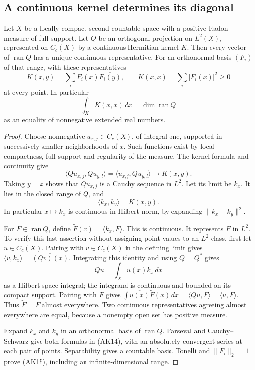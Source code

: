\subsection{A continuous kernel determines its diagonal}

\begin{lemma}\label{ak-diagonal}
Let \(X\) be a locally compact second countable space
with a positive Radon measure of full support.
Let \(Q\) be an orthogonal projection on \(L^2(X)\),
represented on \(C_c(X)\) by a continuous Hermitian
kernel \(K\).  Then every vector of \(\operatorname{ran}Q\)
has a unique continuous representative.  For an orthonormal
basis \((F_i)\) of that range, with these representatives,
\[
 K(x,y)=\sum_iF_i(x)\overline{F_i(y)},\qquad
 K(x,x)=\sum_i|F_i(x)|^2\ge0
 \tag{AK14}
\]
at every point.  In particular
\[
                \int_X K(x,x)\,dx
                    =\dim\operatorname{ran}Q
 \tag{AK15}
\]
as an equality of nonnegative extended real numbers.
\end{lemma}
\begin{proof}
Choose nonnegative \(u_{x,j}\in C_c(X)\), of integral
one, supported in successively smaller neighborhoods
of \(x\).  Such functions exist by local compactness,
full support and regularity of the measure.  The kernel
formula and continuity give
\[
 \langle Qu_{x,j},Qu_{y,l}\rangle
   =\langle u_{x,j},Qu_{y,l}\rangle
                   \longrightarrow K(x,y).
\]
Taking \(y=x\) shows that \(Qu_{x,j}\) is a Cauchy
sequence in \(L^2\).  Let its limit be \(k_x\).
It lies in the closed range of \(Q\), and
\[
                  \langle k_x,k_y\rangle=K(x,y).
 \tag{AK16}
\]
In particular \(x\mapsto k_x\) is continuous in Hilbert
norm, by expanding \(\|k_x-k_y\|^2\).

For \(F\in\operatorname{ran}Q\), define
\(\widetilde F(x)=\langle k_x,F\rangle\).
This is continuous.  It represents \(F\) in \(L^2\).
To verify this last assertion without assigning point
values to an \(L^2\) class, first let \(u\in C_c(X)\).
Pairing with \(v\in C_c(X)\) in the defining limit gives
\(\langle v,k_x\rangle=\overline{(Qv)(x)}\).
Integrating this identity and using \(Q=Q^*\) gives
\[
                Qu=\int_X u(x)k_x\,dx
\]
as a Hilbert space integral; the integrand is continuous
and bounded on its compact support.
Pairing with \(F\) gives
\(\int\overline{u(x)}\widetilde F(x)\,dx
=\langle Qu,F\rangle=\langle u,F\rangle\).
Thus \(\widetilde F=F\) almost everywhere.
Two continuous representatives agreeing almost everywhere
are equal, because a nonempty open set has positive measure.

Expand \(k_x\) and \(k_y\) in an orthonormal basis of
\(\operatorname{ran}Q\).  Parseval and Cauchy--Schwarz
give both formulas in (AK14), with an absolutely convergent
series at each pair of points.  Separability gives a
countable basis.  Tonelli and \(\|F_i\|_2=1\) prove
(AK15), including an infinite-dimensional range.
\end{proof}

